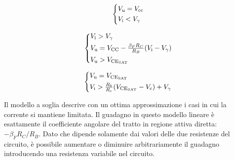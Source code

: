 \documentclass[../elettronica]{subfiles}
\begin{document}
\noindent
\begin{minipage}{.5\textwidth}
    \begin{tcolorbox}[title=OFF]
        \vspace{1.2em}
        \[\begin{cases*}
            \vu = \V{cc}\\
            \vi < V_\gamma
        \end{cases*}\]
    \end{tcolorbox}
    \begin{tcolorbox}[title=AD]
        \vspace{-1.2em}
        \[\begin{cases*}
            \vi > V_\gamma \\
            \vu = \V{CC} - \frac{\beta_F R_C}{R_B} (\vi - V_\gamma)\\
            \vu > \vcesat
        \end{cases*}\]
    \end{tcolorbox}
    \begin{tcolorbox}[title=SAT]
        \[\begin{cases*}
            \vu = \vcesat\\
            \vi > \frac{R_b}{R_c}(\vcesat - \V{c}) + V_\gamma
        \end{cases*}\]
    \end{tcolorbox}
\end{minipage}
\begin{minipage}{.48\textwidth}
        \centering
\end{minipage}

\noindent
Il modello a soglia descrive con un ottima approssimazione i casi in cui la corrente si mantiene limitata.
Il guadagno in questo modello lineare è esattamente il coefficiente angolare del tratto in regione attiva diretta: $-\beta_F R_C / R_B$.
Dato che dipende solamente dai valori delle due resistenze del circuito, è possibile aumentare o diminuire arbitrariamente il
guadagno introducendo una resistenza variabile nel circuito.
\end{document}

